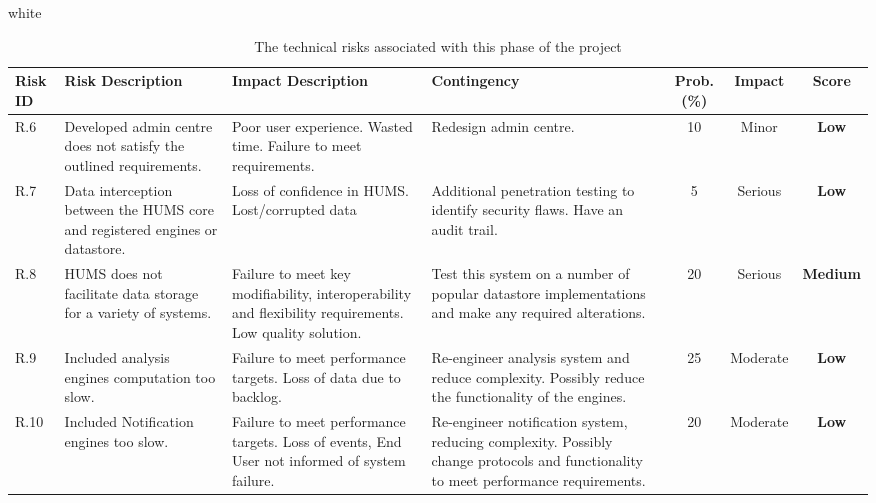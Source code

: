 \documentclass[10pt,a4paper]{article}
\newcommand{\tableformat}[4]{
\begin{table}[t]
\centering
  \rowcolors{2}{gray!10} {white}
\begin{tabular}{#1}
  \hline
  \rowcolor[gray]{0.9} #2
\end{tabular}
\caption{#3}
\label{#4}
\end{table}}
\begin{document}
\tableformat{p{0.8cm} p{3cm} p{3cm} p{3cm} c c c}
{ 	\hline
    Risk ID & Risk Description & Impact Description & Contingency & Prob.(\%) & Impact & Score \\
  	\hline
  
    R.6 & Developed admin centre does not satisfy the outlined requirements. & Poor user experience. Wasted time. Failure to meet requirements. & Redesign admin centre. & 10 & Minor & \textbf{Low} \\
    R.7 & Data interception between the HUMS core and registered engines or datastore. & Loss of confidence in HUMS. Lost/corrupted data & Additional penetration testing to identify security flaws. Have an audit trail. & 5 & Serious &  \textbf{Low} \\
    R.8 & HUMS does not facilitate data storage for a variety of systems. & Failure to meet key modifiability, interoperability and flexibility requirements. Low quality solution. &  Test this system on a number of popular datastore implementations and make any required alterations. & 20 & Serious & \textbf{Medium} \\
    R.9 & Included analysis engines computation too slow. & Failure to meet performance targets. Loss of data due to backlog. & Re-engineer analysis system and reduce complexity. Possibly reduce the functionality of the engines. & 25 & Moderate & \textbf{Low} \\	
    R.10 & Included Notification engines too slow. & Failure to meet performance targets. Loss of events, End User not informed of system failure. & Re-engineer notification system, reducing complexity. Possibly change protocols and functionality to meet performance requirements. & 20 & Moderate & \textbf{Low} \\	
  	\hline
}
{The technical risks associated with this phase of the project}{tab:tech_risks}
\end{document}

